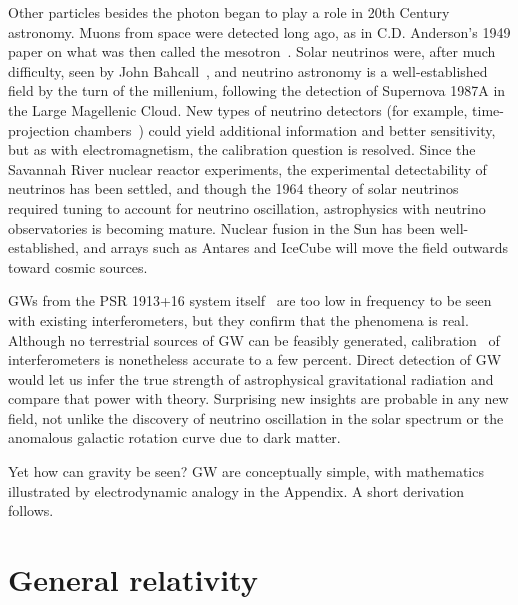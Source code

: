 Other particles besides the photon began to play a role in 20th Century astronomy.
Muons from space were detected long ago, as in C.D. Anderson's 1949 paper on what was then called the mesotron~\cite{CDAnderson}. 
Solar neutrinos were, after much difficulty, seen by John Bahcall~\cite{NeutrinoReview}, and neutrino astronomy is a well-established field by the turn of the millenium, following the detection of Supernova 1987A in the Large Magellenic Cloud. 
New types of neutrino detectors (for example, time-projection chambers~\cite{EBubble2005,MeadorsNevis2006}) could yield additional information and better sensitivity, but as with electromagnetism, the calibration question is resolved. 
Since the Savannah River nuclear reactor experiments, the experimental detectability of neutrinos has been settled, and though the 1964 theory of solar neutrinos~\cite{NeutrinosSolarTheoretical} required tuning to account for neutrino oscillation, astrophysics with neutrino observatories is becoming mature.
Nuclear fusion in the Sun has been well-established, and arrays such as Antares and IceCube will move the field outwards toward cosmic sources.


 GWs from the PSR 1913+16 system itself~\cite{WeisbergTaylor2004} are too low in frequency to be seen with existing interferometers, but they confirm that the phenomena is real.
Although no terrestrial sources of GW can be feasibly generated, calibration~\cite{AbadieCalibration2010} of interferometers is nonetheless accurate to a few percent.
Direct detection of GW would let us infer the true strength of astrophysical gravitational radiation and compare that power with theory. 
Surprising new insights are probable in any new field, not unlike the discovery of neutrino oscillation in the solar spectrum or the anomalous galactic rotation curve due to dark matter.

Yet how can gravity be seen?
GW are conceptually simple, with mathematics illustrated by electrodynamic analogy in the Appendix.
A short derivation follows.




    \section{General relativity}
    \label{general_relativity}

